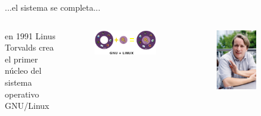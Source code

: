 \documentclass{beamer}
\begin{document}
\begin{frame}{...el sistema se completa...}
  \begin{columns}[t]
     en 1991 Linus Torvalds crea el primer núcleo         del sistema     operativo GNU/Linux
    \begin{figure}
      \centering
      \includegraphics[width=1\textwidth]{pics/gnu-mas-linux.png}
    \end{figure}

    \begin{figure}
      \centering
      \includegraphics[width=0.6\textwidth]{pics/Linus_Torvalds_talking.jpeg}
    \end{figure}
  \end{columns}
\end{frame}
\end{document}
